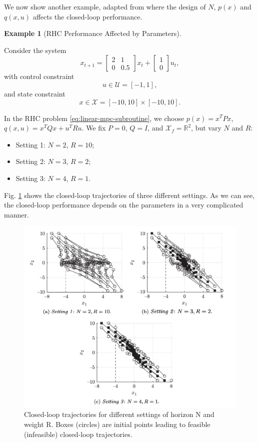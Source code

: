 \documentclass[
]{book}
\theoremstyle{definition}
\theoremstyle{definition}
\newtheorem{example}{Example}[chapter]
\theoremstyle{definition}
\theoremstyle{definition}
\theoremstyle{remark}
\begin{document}
We now show another example, adapted from \citep{borrelli17book-mpc} where the design of \(N\), \(p(x)\) and \(q(x,u)\) affects the closed-loop performance.

\begin{example}[RHC Performance Affected by Parameters]
\protect\hypertarget{exm:mpc-linear-design-choice}{}\label{exm:mpc-linear-design-choice}

Consider the system
\[
x_{t+1} = \begin{bmatrix}
2 & 1 \\ 0 & 0.5
\end{bmatrix} x_t + \begin{bmatrix} 1 \\ 0 \end{bmatrix} u_t,
\]
with control constraint
\[
u \in \mathcal{U} = [-1,1],
\]
and state constraint
\[
x \in \mathcal{X} = [-10,10] \times [-10,10].
\]

In the RHC problem \eqref{eq:linear-mpc-subroutine}, we choose \(p(x) = x^T P x\), \(q(x,u) = x^T Q x + u^T R u\). We fix \(P=0\), \(Q = I\), and \(\mathcal{X}_f = \mathbb{R}^2\), but vary \(N\) and \(R\):

\begin{itemize}
\item
  Setting 1: \(N=2\), \(R = 10\);
\item
  Setting 2: \(N=3\), \(R = 2\);
\item
  Setting 3: \(N=4\), \(R=1\).
\end{itemize}

Fig. \ref{fig:mpc-linear-effect-parameters} shows the closed-loop trajectories of three different settings. As we can see, the closed-loop performance depends on the parameters in a very complicated manner.

\begin{figure}

{\centering \includegraphics[width=0.8\linewidth]{images/mpc_linear_effect_parameter} 

}

\caption{Closed-loop trajectories for different settings of horizon N and weight R. Boxes (circles) are initial points leading to feasible (infeasible) closed-loop trajectories.}\label{fig:mpc-linear-effect-parameters}
\end{figure}

\end{example}
\end{document}
